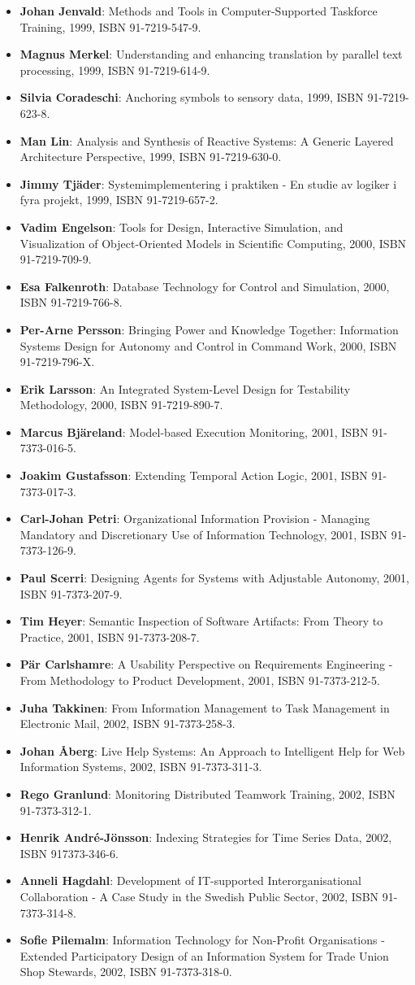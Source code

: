 \documentclass[a4paper,showtrims,twocolumn]{memoir}
\newenvironment{theses}
  {
    \begin{itemize}
      \setlength{\itemsep}{0.2em}
      \setlength{\parskip}{0em}
      \setlength{\parsep}{0em}
  }
  {
    \end{itemize}
  }
\newcommand{\thesis}[5]{\item[No. #1] \textbf{#2}: #3, #4, ISBN #5.}
\begin{document}
\begin{theses}
    \thesis{598}{Johan Jenvald}{Methods and Tools in Computer-Supported Taskforce Training}{1999}{91-7219-547-9}
    \thesis{607}{Magnus Merkel}{Understanding and enhancing translation by parallel text processing}{1999}{91-7219-614-9}
    \thesis{611}{Silvia Coradeschi}{Anchoring symbols to sensory data}{1999}{91-7219-623-8}
    \thesis{613}{Man Lin}{Analysis and Synthesis of Reactive Systems: A Generic Layered Architecture Perspective}{1999}{91-7219-630-0}
    \thesis{618}{Jimmy Tjäder}{Systemimplementering i praktiken - En studie av logiker i fyra projekt}{1999}{91-7219-657-2}
    \thesis{627}{Vadim Engelson}{Tools for Design, Interactive Simulation, and Visualization of Object-Oriented Models in Scientific Computing}{2000}{91-7219-709-9}
    \thesis{637}{Esa Falkenroth}{Database Technology for Control and Simulation}{2000}{91-7219-766-8}
    \thesis{639}{Per-Arne Persson}{Bringing Power and Knowledge Together: Information Systems Design for Autonomy and Control in Command Work}{2000}{91-7219-796-X}
    \thesis{660}{Erik Larsson}{An Integrated System-Level Design for Testability Methodology}{2000}{91-7219-890-7}
    \thesis{688}{Marcus Bjäreland}{Model-based Execution Monitoring}{2001}{91-7373-016-5}
    \thesis{689}{Joakim Gustafsson}{Extending Temporal Action Logic}{2001}{91-7373-017-3}
    \thesis{720}{Carl-Johan Petri}{Organizational Information Provision - Managing Mandatory and Discretionary Use of Information Technology}{2001}{91-7373-126-9}
    \thesis{724}{Paul Scerri}{Designing Agents for Systems with Adjustable Autonomy}{2001}{91-7373-207-9}
    \thesis{725}{Tim Heyer}{Semantic Inspection of Software Artifacts: From Theory to Practice}{2001}{91-7373-208-7}
    \thesis{726}{Pär Carlshamre}{A Usability Perspective on Requirements Engineering - From Methodology to Product Development}{2001}{91-7373-212-5}
    \thesis{732}{Juha Takkinen}{From Information Management to Task Management in Electronic Mail}{2002}{91-7373-258-3}
    \thesis{745}{Johan Åberg}{Live Help Systems: An Approach to Intelligent Help for Web Information Systems}{2002}{91-7373-311-3}
    \thesis{746}{Rego Granlund}{Monitoring Distributed Teamwork Training}{2002}{91-7373-312-1}
    \thesis{757}{Henrik André-Jönsson}{Indexing Strategies for Time Series Data}{2002}{917373-346-6}
    \thesis{747}{Anneli Hagdahl}{Development of IT-supported Interorganisational Collaboration - A Case Study in the Swedish Public Sector}{2002}{91-7373-314-8}
    \thesis{749}{Sofie Pilemalm}{Information Technology for Non-Profit Organisations - Extended Participatory Design of an Information System for Trade Union Shop Stewards}{2002}{91-7373-318-0}

\end{theses}
\end{document}
